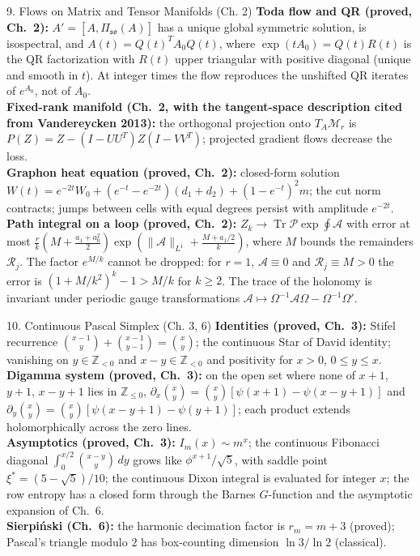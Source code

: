 \documentclass[11pt,a4paper,oneside]{article}
\begin{document}
\begin{conceptbox}{{9. Flows on Matrix and Tensor Manifolds (Ch. 2)}}
\textbf{Toda flow and QR (proved, Ch.~2):} $A' = [A, \Pi_{\mathfrak{so}}(A)]$ has a unique global symmetric solution, is isospectral, and $A(t) = Q(t)^T A_0 Q(t)$, where $\exp(tA_0) = Q(t)R(t)$ is the QR factorization with $R(t)$ upper triangular with positive diagonal (unique and smooth in $t$). At integer times the flow reproduces the unshifted QR iterates of $e^{A_0}$, not of $A_0$.\\
\textbf{Fixed-rank manifold (Ch.~2, with the tangent-space description cited from Vandereycken 2013):} the orthogonal projection onto $T_A\mathcal{M}_r$ is $P(Z) = Z - (I - UU^T)Z(I - VV^T)$; projected gradient flows decrease the loss.\\
\textbf{Graphon heat equation (proved, Ch.~2):} closed-form solution $W(t) = e^{-2t}W_0 + (e^{-t} - e^{-2t})(d_1 + d_2) + (1 - e^{-t})^2 m$; the cut norm contracts; jumps between cells with equal degrees persist with amplitude $e^{-2t}$.\\
\textbf{Path integral on a loop (proved, Ch.~2):} $Z_k \to \operatorname{Tr}\mathcal{P}\exp\oint\mathcal{A}$ with error at most $\frac{r}{k}(M + \frac{a_1 + a_0^2}{2})\exp(\|\mathcal{A}\|_{L^1} + \frac{M + a_1/2}{k})$, where $M$ bounds the remainders $\mathcal{R}_j$. The factor $e^{M/k}$ cannot be dropped: for $r = 1$, $\mathcal{A} \equiv 0$ and $\mathcal{R}_j \equiv M > 0$ the error is $(1 + M/k^2)^k - 1 > M/k$ for $k \ge 2$. The trace of the holonomy is invariant under periodic gauge transformations $\mathcal{A} \mapsto \Omega^{-1}\mathcal{A}\Omega - \Omega^{-1}\Omega'$.
\end{conceptbox}

\begin{conceptbox}{{10. Continuous Pascal Simplex (Ch. 3, 6)}}
\textbf{Identities (proved, Ch.~3):} Stifel recurrence $\binom{x-1}{y} + \binom{x-1}{y-1} = \binom{x}{y}$; the continuous Star of David identity; vanishing on $y \in \mathbb{Z}_{<0}$ and $x - y \in \mathbb{Z}_{<0}$ and positivity for $x > 0$, $0 \le y \le x$.\\
\textbf{Digamma system (proved, Ch.~3):} on the open set where none of $x+1$, $y+1$, $x-y+1$ lies in $\mathbb{Z}_{\le 0}$, $\partial_x\binom{x}{y} = \binom{x}{y}[\psi(x+1) - \psi(x-y+1)]$ and $\partial_y\binom{x}{y} = \binom{x}{y}[\psi(x-y+1) - \psi(y+1)]$; each product extends holomorphically across the zero lines.\\
\textbf{Asymptotics (proved, Ch.~3):} $I_m(x) \sim m^x$; the continuous Fibonacci diagonal $\int_0^{x/2}\binom{x-y}{y}\,dy$ grows like $\phi^{x+1}/\sqrt5$, with saddle point $\xi^* = (5 - \sqrt5)/10$; the continuous Dixon integral is evaluated for integer $x$; the row entropy has a closed form through the Barnes $G$-function and the asymptotic expansion of Ch.~6.\\
\textbf{Sierpi\'nski (Ch.~6):} the harmonic decimation factor is $r_m = m+3$ (proved); Pascal's triangle modulo $2$ has box-counting dimension $\ln 3/\ln 2$ (classical).
\end{conceptbox}
\end{document}
